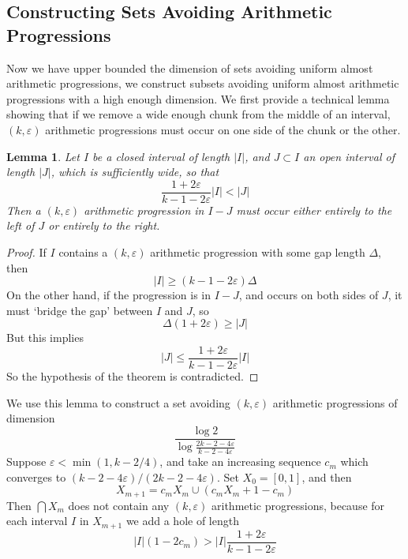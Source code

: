 \documentclass{article}
\theoremstyle{plain}
\newtheorem{lemma}{Lemma}
\theoremstyle{plain}
\begin{document}
\subsection{Constructing Sets Avoiding Arithmetic Progressions}

Now we have upper bounded the dimension of sets avoiding uniform almost arithmetic progressions, we construct subsets avoiding uniform almost arithmetic progressions with a high enough dimension. We first provide a technical lemma showing that if we remove a wide enough chunk from the middle of an interval, $(k,\varepsilon)$ arithmetic progressions must occur on one side of the chunk or the other.

\begin{lemma}
    Let $I$ be a closed interval of length $|I|$, and $J \subset I$ an open interval of length $|J|$, which is sufficiently wide, so that
    \[ \frac{1 + 2 \varepsilon}{k - 1 - 2\varepsilon} |I| < |J| \]
    Then a $(k,\varepsilon)$ arithmetic progression in $I - J$ must occur either entirely to the left of $J$ or entirely to the right.
\end{lemma}
\begin{proof}
    If $I$ contains a $(k,\varepsilon)$ arithmetic progression with some gap length $\Delta$, then
    \[ |I| \geq (k - 1 - 2\varepsilon) \Delta \]
    On the other hand, if the progression is in $I - J$, and occurs on both sides of $J$, it must `bridge the gap' between $I$ and $J$, so
    \[ \Delta (1 + 2\varepsilon) \geq |J| \]
    But this implies
    \[ |J| \leq \frac{1 + 2 \varepsilon}{k - 1 - 2 \varepsilon} |I| \]
    So the hypothesis of the theorem is contradicted.
\end{proof}

We use this lemma to construct a set avoiding $(k,\varepsilon)$ arithmetic progressions of dimension
%
\[ \frac{\log 2}{\log \frac{2k - 2 - 4\varepsilon}{k - 2 - 4\varepsilon}} \]
%
Suppose $\varepsilon < \min(1, k-2/4)$, and take an increasing sequence $c_m$ which converges to $(k-2-4\varepsilon)/(2k - 2 - 4\varepsilon)$. Set $X_0 = [0,1]$, and then
%
\[ X_{m+1} = c_m X_m \cup (c_m X_m + 1 - c_m) \]
%
Then $\bigcap X_m$ does not contain any $(k,\varepsilon)$ arithmetic progressions, because for each interval $I$ in $X_{m+1}$ we add a hole of length
%
\[ |I|(1 - 2c_m) > |I| \frac{1 + 2 \varepsilon}{k - 1 - 2 \varepsilon} \]
\end{document}
